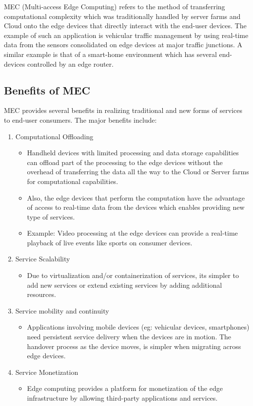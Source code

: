 MEC (Multi-access Edge Computing) refers to the method of transferring computational complexity which was traditionally handled by server farms and Cloud onto the edge devices that directly interact with the end-user devices. The example of such an application is vehicular traffic management by using real-time data from the sensors consolidated on edge devices at major traffic junctions. A similar example is that of a smart-home environment which has several end-devices controlled by an edge router. 

\subsection{Benefits of MEC}
MEC provides several benefits in realizing traditional and new forms of services to end-user consumers. The major benefits include:

\begin{enumerate}
	\item Computational Offloading
	    \begin{itemize}
		\item Handheld devices with limited processing and data storage capabilities can offload part of the processing to the edge devices without the overhead of transferring the data all the way to the Cloud or Server farms for computational capabilities.
		\item Also, the edge devices that perform the computation have the advantage of access to real-time data from the devices which enables providing new type of services.
		\item Example: Video processing at the edge devices can provide a real-time playback of live events like sports on consumer devices. 
	    \end{itemize}
	\item Service Scalability
	    \begin{itemize}
		\item Due to virtualization and/or containerization of services, its simpler to add new services or extend existing services by adding additional resources.	 
	    \end{itemize}
        \item Service mobility and continuity
    	    \begin{itemize}
                \item Applications involving mobile devices (eg: vehicular devices, smartphones) need persistent service delivery when the devices are in motion. The handover process as the device moves, is simpler when migrating across edge devices.
            \end{itemize}
        \item Service Monetization
    	    \begin{itemize}
                \item Edge computing provides a platform for monetization of the edge infrastructure by allowing third-party applications and services.
            \end{itemize}
\end{enumerate}

